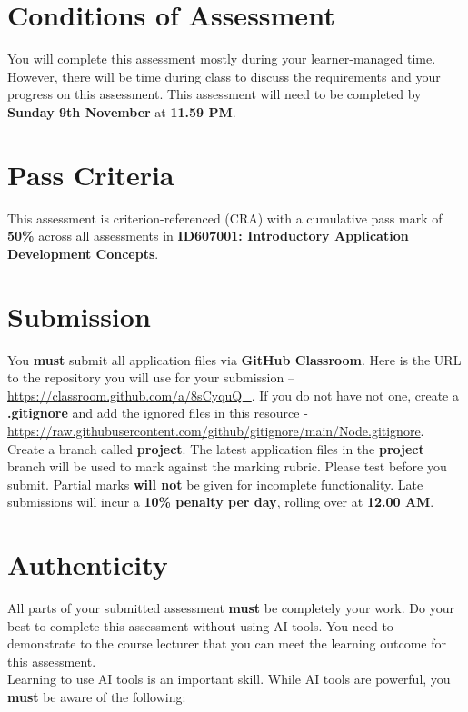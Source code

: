 \documentclass{article}
\begin{document}
\section*{Conditions of Assessment}
You will complete this assessment mostly during your learner-managed time. However, there will be time during class to discuss the requirements and your progress on this assessment. This assessment will need to be completed by \textbf{Sunday 9th November} at \textbf{11.59 PM}.

\section*{Pass Criteria}
This assessment is criterion-referenced (CRA) with a cumulative pass mark of \textbf{50\%} across all assessments in \textbf{ID607001: Introductory Application Development Concepts}.

\section*{Submission}
You \textbf{must} submit all application files via \textbf{GitHub Classroom}. Here is the URL to the repository you will use for your submission – \href{https://classroom.github.com/a/8sCyquQ\_}{https://classroom.github.com/a/8sCyquQ\_}. If you do not have not one, create a \textbf{.gitignore} and add the ignored files in this resource - \href{https://raw.githubusercontent.com/github/gitignore/main/Node.gitignore}{https://raw.githubusercontent.com/github/gitignore/main/Node.gitignore}. \\ 

Create a branch called \textbf{project}. The latest application files in the \textbf{project} branch will be used to mark against the marking rubric. Please test before you submit. Partial marks \textbf{will not} be given for incomplete functionality. Late submissions will incur a \textbf{10\% penalty per day}, rolling over at \textbf{12.00 AM}.

\section*{Authenticity}
All parts of your submitted assessment \textbf{must} be completely your work. Do your best to complete this assessment without using  AI tools. You need to demonstrate to the course lecturer that you can meet the learning outcome for this assessment. \\
 
Learning to use AI tools is an important skill. While AI tools are powerful, you \textbf{must} be aware of the following:
\end{document}
